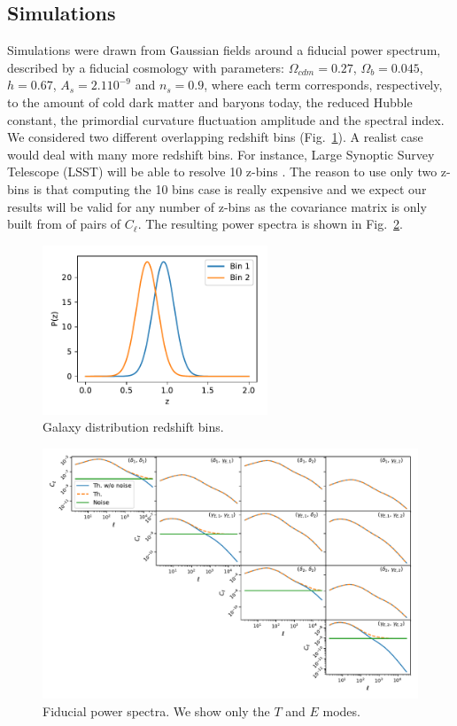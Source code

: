 \documentclass[a4paper,11pt]{article}
\newcommand{\cl}{C_\ell}
\begin{document}
\subsection{Simulations}

Simulations were drawn from Gaussian fields around a fiducial power spectrum,
described by a fiducial cosmology with parameters: $\Omega_{cdm} = 0.27$,
$\Omega_b = 0.045$, $h = 0.67$, $A_s = 2.1 10^{-9}$ and $n_s = 0.9$, where
each term corresponds, respectively, to the amount of cold dark matter and
baryons today, the reduced Hubble constant, the primordial curvature
fluctuation amplitude and the spectral index. We considered two different
overlapping redshift bins (Fig.~\ref{fig:pz}). A realist case would deal with
many more redshift bins. For instance, Large Synoptic Survey Telescope (LSST)
will be able to resolve 10 z-bins \cite{2009arXiv0912.0201L}. The reason to
use only two z-bins is that computing the 10 bins case is really
expensive and we expect our results will be valid for any number of z-bins as
the covariance matrix is only built from of pairs of $\cl$. The resulting
power spectra is shown in Fig.~\ref{fig:cl-2bins}. 

\begin{figure}
  \centering
  \includegraphics[width=0.6\textwidth]{./figures/pz.pdf}
  \caption{Galaxy distribution redshift bins.}
  \label{fig:pz}
\end{figure}

\begin{figure}
  \centering
  \includegraphics[width=\textwidth]{./figures/cls-sph-2b.pdf}
  \caption{Fiducial power spectra. We show only the $T$ and $E$ modes.}
  \label{fig:cl-2bins}
\end{figure}
\end{document}

